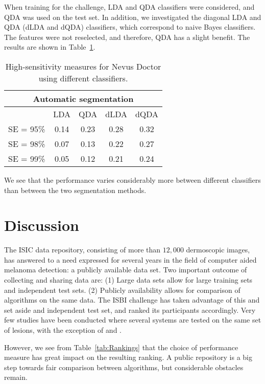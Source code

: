 \documentclass[a4paper,12pt]{article}
\begin{document}
When training for the challenge, LDA and QDA classifiers were considered, and QDA was used on the test set. 
In addition, we investigated the diagonal LDA and QDA (dLDA and dQDA) classifiers, which correspond to naive Bayes classifiers. 
The features were not reselected, and therefore, QDA has a slight benefit. 
The results are shown in Table~\ref{tab:Diagonal}. 
\begin{table}
\begin{tabular}{c | c | c | c | c}
        \multicolumn{5}{c}{Automatic segmentation} \\
        \hline
        & LDA & QDA & dLDA & dQDA \\
        \hline
   SE = 95\% & 0.14 & 0.23 & 0.28 &0.32\\
  SE = 98\% & 0.07 & 0.13 & 0.22 & 0.27 \\
  SE = 99\% & 0.05 & 0.12 & 0.21 & 0.24 
\end{tabular}
  \caption{High-sensitivity measures for Nevus Doctor using different classifiers.}
  \label{tab:Diagonal}
\end{table}
We see that the performance varies considerably more between different classifiers than between the two segmentation methods. 

\section{Discussion} \label{sec:Discussion} %

The ISIC data repository, consisting of more than $12,000$ dermoscopic images, has answered to a need expressed for several years in the field of computer aided melanoma detection: a publicly available data set. 
Two important outcome of collecting and sharing data are: 
(1) Large data sets allow for large training sets and independent test sets. (2) Publicly availability allows for comparison of algorithms on the same data.
The ISBI challenge has taken advantage of this and set aside and independent test set, and ranked its participants accordingly.
Very few studies have been conducted where several systems are tested on the same set of lesions, with the exception of \cite{Perrinaud2007Can} and \cite{Mollersen2015Computeraided}. 

However, we see from Table~\ref{tab:Rankings} that the choice of performance measure has great impact on the resulting ranking. 
A public repository is a big step towards fair comparison between algorithms, but considerable obstacles remain.
\end{document}

